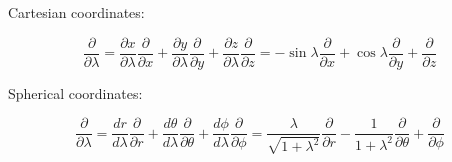 \documentclass[a4paper,11pt]{article}
\begin{document}
Cartesian coordinates:

\begin{equation}
    \frac{\partial}{\partial\lambda} = \frac{\partial x}{\partial\lambda}\frac{\partial}{\partial x} + \frac{\partial y}{\partial\lambda}\frac{\partial}{\partial y} + \frac{\partial z}{\partial\lambda}\frac{\partial}{\partial z} = -\sin\lambda\frac{\partial}{\partial x} + \cos\lambda\frac{\partial}{\partial y} + \frac{\partial}{\partial z}
\end{equation}


Spherical coordinates:

\begin{equation}
    \frac{\partial}{\partial\lambda} = \frac{dr}{d\lambda}\frac{\partial}{\partial r} + \frac{d\theta}{d\lambda}\frac{\partial}{\partial \theta} + \frac{d\phi}{d\lambda}\frac{\partial}{\partial \phi} = \frac{\lambda}{\sqrt{1+\lambda^2}}\frac{\partial}{\partial r} - \frac{1}{1+\lambda^2}\frac{\partial}{\partial \theta} + \frac{\partial}{\partial \phi}
\end{equation}
\end{document}
